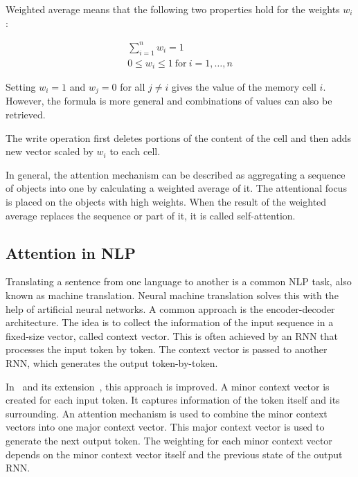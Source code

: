\documentclass[a4paper]{scrartcl}
\begin{document}
    Weighted average means that the following two properties hold for the weights $w_i$:

    \begin{gather}
        \sum_{i=1}^{n} w_i = 1 \\
        0 \leq w_i \leq 1 \ \text{for} \ i = 1, \dots, n
    \end{gather}

    Setting $w_i = 1$ and $w_j = 0$ for all $j \neq i$ gives the value of the memory cell $i$.
    However, the formula is more general and combinations of values can also be retrieved.

    The write operation first deletes portions of the content of the cell and then adds new vector scaled by $w_i$ to each cell.

    In general, the attention mechanism can be described as aggregating a sequence of objects into one by calculating a weighted average of it.
    The attentional focus is placed on the objects with high weights.
    When the result of the weighted average replaces the sequence or part of it, it is called self-attention.

    \subsection{Attention in NLP}\label{subsec:attention-in-nlp}
    Translating a sentence from one language to another is a common NLP task, also known as machine translation.
    Neural machine translation solves this with the help of artificial neural networks.
    A common approach is the encoder-decoder architecture.
    The idea is to collect the information of the input sequence in a fixed-size vector, called context vector.
    This is often achieved by an RNN that processes the input token by token.
    The context vector is passed to another RNN, which generates the output token-by-token.

    In~\cite{bahdanau2016neural} and its extension~\cite{luong2015effective}, this approach is improved.
    A minor context vector is created for each input token.
    It captures information of the token itself and its surrounding.
    An attention mechanism is used to combine the minor context vectors into one major context vector.
    This major context vector is used to generate the next output token.
    The weighting for each minor context vector depends on the minor context vector itself and the previous state of the output RNN\@.
\end{document}
